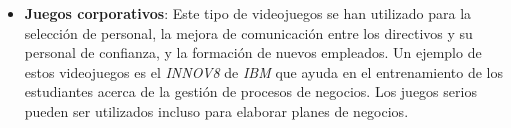 \begin{itemize}
\item \textbf{Juegos corporativos}: Este tipo de videojuegos se han utilizado
    para la selección de personal, la mejora de comunicación entre los
    directivos y su personal de confianza, y la formación de nuevos empleados.
    Un ejemplo de estos videojuegos es el \emph{INNOV8} de \emph{IBM} que ayuda
    en el entrenamiento de los estudiantes acerca de la gestión de procesos de
    negocios. Los juegos serios pueden ser utilizados incluso para elaborar
    planes de negocios\cite{education:games}. 

\end{itemize}
